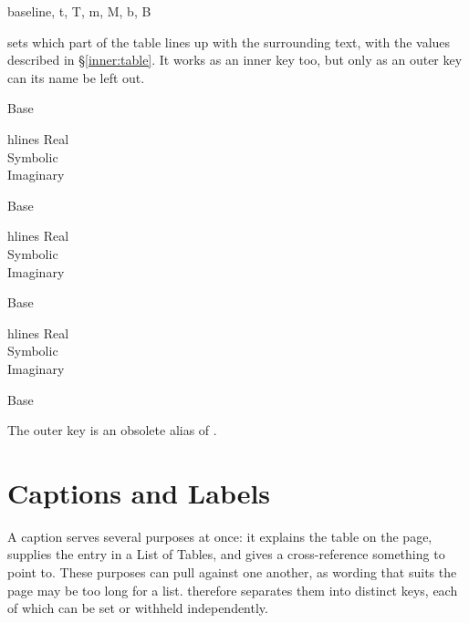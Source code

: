 \begin{codedescribe}[
        key,
        new=2021G,
        update=2022A
    ]{baseline, t, T, m, M, b, B}
    \begin{codesyntax}
    \end{codesyntax}
     sets which part of the table lines up with the surrounding text, with the values described in \S\ref{inner:table}. It works as an inner key too, but only as an outer key can its name be left out.

    \begin{codestore}[st=outer:baseline]
        Base\begin{tblr}[t]{hlines}
            Real \\ Symbolic \\ Imaginary
        \end{tblr}Base\begin{tblr}[m]{hlines}
            Real \\ Symbolic \\ Imaginary
        \end{tblr}Base\begin{tblr}[B]{hlines}
            Real \\ Symbolic \\ Imaginary
        \end{tblr}Base\end{codestore}
    \begin{center}
    \end{center}
    \begin{tsremark}
        The outer key  is an obsolete alias of .
    \end{tsremark}
\end{codedescribe}

\section{Captions and Labels}\label{outer:captions}
A caption serves several purposes at once: it explains the table on the page, supplies the entry in a List of Tables, and gives a cross-reference something to point to. These purposes can pull against one another, as wording that suits the page may be too long for a list.  therefore separates them into distinct keys, each of which can be set or withheld independently.


